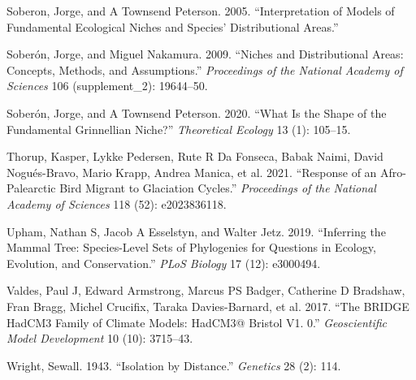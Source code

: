 \documentclass[
]{article}
\newlength{\cslhangindent}
\newlength{\cslentryspacingunit} %
\newenvironment{CSLReferences}[2] %
 {%
  \setlength{\parindent}{0pt}
  \ifodd #1
  \let\oldpar\par
  \def\par{\hangindent=\cslhangindent\oldpar}
  \fi
  \setlength{\parskip}{#2\cslentryspacingunit}
 }%
 {}
\begin{document}
\begin{CSLReferences}{1}{0}
\leavevmode{}%
Soberon, Jorge, and A Townsend Peterson. 2005. {``Interpretation of
Models of Fundamental Ecological Niches and Species' Distributional
Areas.''}

\leavevmode{}%
Soberón, Jorge, and Miguel Nakamura. 2009. {``Niches and Distributional
Areas: Concepts, Methods, and Assumptions.''} \emph{Proceedings of the
National Academy of Sciences} 106 (supplement\_2): 19644--50.

\leavevmode{}%
Soberón, Jorge, and A Townsend Peterson. 2020. {``What Is the Shape of
the Fundamental Grinnellian Niche?''} \emph{Theoretical Ecology} 13 (1):
105--15.

\leavevmode{}%
Thorup, Kasper, Lykke Pedersen, Rute R Da Fonseca, Babak Naimi, David
Nogués-Bravo, Mario Krapp, Andrea Manica, et al. 2021. {``Response of an
Afro-Palearctic Bird Migrant to Glaciation Cycles.''} \emph{Proceedings
of the National Academy of Sciences} 118 (52): e2023836118.

\leavevmode{}%
Upham, Nathan S, Jacob A Esselstyn, and Walter Jetz. 2019. {``Inferring
the Mammal Tree: Species-Level Sets of Phylogenies for Questions in
Ecology, Evolution, and Conservation.''} \emph{PLoS Biology} 17 (12):
e3000494.

\leavevmode{}%
Valdes, Paul J, Edward Armstrong, Marcus PS Badger, Catherine D
Bradshaw, Fran Bragg, Michel Crucifix, Taraka Davies-Barnard, et al.
2017. {``The BRIDGE HadCM3 Family of Climate Models: HadCM3@ Bristol V1.
0.''} \emph{Geoscientific Model Development} 10 (10): 3715--43.

\leavevmode{}%
Wright, Sewall. 1943. {``Isolation by Distance.''} \emph{Genetics} 28
(2): 114.

\end{CSLReferences}
\end{document}
